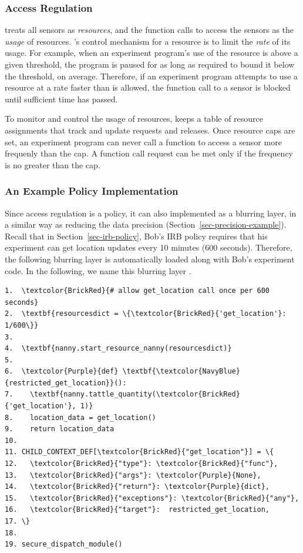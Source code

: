 \subsubsection{Access Regulation}

 treats all sensors as \textit{resources}, and the function calls to 
access the sensors as the \textit{usage} of resources. 's control 
mechanism for a resource is to limit the \textit{rate} of its usage. For example, 
when an 
experiment program's use of the resource is above a given threshold, the 
program is paused for as long as required to bound it below the
threshold, on average. Therefore, if an experiment program attempts to 
use a resource at a rate faster than is allowed, the function 
call to a sensor is blocked until sufficient time has passed. 

To monitor and control the usage of resources,  keeps a 
table of resource assignments that track and update requests and releases. 
Once resource caps are set, an experiment program can never call a 
function to access a sensor more frequenly than the cap. A function call 
request can be met only if the frequency is no greater than the cap. 

\subsubsection{An Example Policy Implementation}\label{sec-rate-example}

Since access regulation is a policy, it can also implemented as a blurring layer, 
in a similar way as reducing the data precision (Section~\ref{sec-precision-example}).
Recall that in Section~\ref{sec-irb-policy}, Bob's IRB policy requires that
his experiment can get location updates every 10 minutes (600 seconds). 
Therefore, the following blurring layer is automatically loaded along with 
Bob's experiment code. In the following, we name this blurring layer 
.

\begin{Verbatim}
1.  \textcolor{BrickRed}{# allow get_location call once per 600 seconds}
2.  \textbf{resourcesdict = \{\textcolor{BrickRed}{'get_location'}: 1/600\}} 
3.
4.  \textbf{nanny.start_resource_nanny(resourcesdict)}
5.
6.  \textcolor{Purple}{def} \textbf{\textcolor{NavyBlue}{restricted_get_location}}():
7.    \textbf{nanny.tattle_quantity(\textcolor{BrickRed}{'get_location'}, 1)}
8.    location_data = get_location()
9.    return location_data
10.
11. CHILD_CONTEXT_DEF[\textcolor{BrickRed}{"get_location"}] = \{
12.   \textcolor{BrickRed}{"type"}: \textcolor{BrickRed}{"func"},
13.   \textcolor{BrickRed}{"args"}: \textcolor{Purple}{None},
14.   \textcolor{BrickRed}{"return"}: \textcolor{Purple}{dict},
15.   \textcolor{BrickRed}{"exceptions"}: \textcolor{BrickRed}{"any"},
16.   \textcolor{BrickRed}{"target"}:  restricted_get_location,
17. \}
18. 
19. secure_dispatch_module()
\end{Verbatim}

